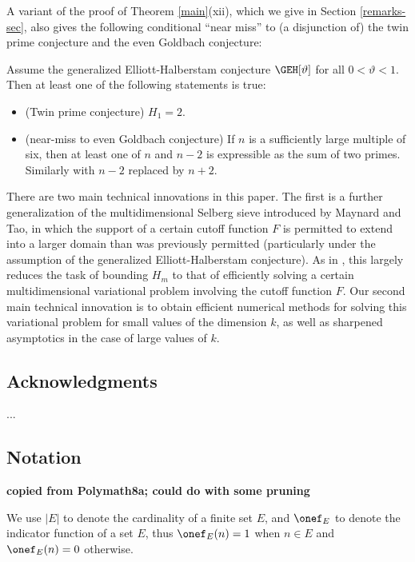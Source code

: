 A variant of the proof of Theorem \ref{main}(xii), which we give in Section \ref{remarks-sec}, also gives the following conditional ``near miss'' to (a disjunction of) the twin prime conjecture and the even Goldbach conjecture:

\begin{theorem}[Disjunction]\label{disj} Assume the generalized Elliott-Halberstam conjecture $\GEH[\vartheta]$ for all $0 < \vartheta < 1$.  Then at least one of the following statements is true:
\begin{itemize}
\item[(a)]  (Twin prime conjecture) $H_1=2$.
\item[(b)]  (near-miss to even Goldbach conjecture)  If $n$ is a sufficiently large multiple of six, then at least one of $n$ and $n-2$ is expressible as the sum of two primes.  Similarly with $n-2$ replaced by $n+2$.
\end{itemize}
\end{theorem}

There are two main technical innovations in this paper.  The first is a further generalization of the multidimensional Selberg sieve introduced by Maynard and Tao, in which the support of a certain cutoff function $F$ is permitted to extend into a larger domain than was previously permitted (particularly under the assumption of the generalized Elliott-Halberstam conjecture).  As in \cite{maynard}, this largely reduces the task of bounding $H_m$ to that of efficiently solving a certain multidimensional variational problem involving the cutoff function $F$.  Our second main technical innovation is to obtain efficient numerical methods for solving this variational problem for small values of the dimension $k$, as well as sharpened asymptotics in the case of large values of $k$.

\subsection{Acknowledgments}

...

\subsection{Notation}

{\bf copied from Polymath8a; could do with some pruning}

We use $|E|$ to denote the cardinality of a finite set $E$, and $\onef_E$ to denote the indicator function of a set $E$, thus $\onef_E(n)=1$ when $n \in E$ and $\onef_E(n)=0$ otherwise.  

